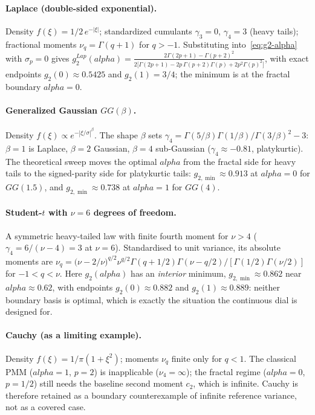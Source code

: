 \documentclass[11pt]{article}
\def\alpha{alpha}%
\def\mathrm#1{#1}%
\def\tfrac#1#2{#1/#2}%
\theoremstyle{definition}
\begin{document}
\paragraph{Laplace (double-sided exponential).}
Density $f(\xi) = \tfrac{1}{2}\,e^{-|\xi|}$; standardized cumulants
$\gamma_3 = 0$, $\gamma_4 = 3$ (heavy tails); fractional moments
$\nu_q = \Gamma(q+1)$ for $q > -1$. Substituting into~\eqref{eq:g2-alpha} with
$\sigma_p = 0$ gives
$g_2^{\mathrm{Lap}}(\alpha) = \frac{2\Gamma(2p+1) - \Gamma(p+2)^2}{2\bigl[\Gamma(2p+1) - 2p\,\Gamma(p+2)\Gamma(p) + 2p^2\Gamma(p)^2\bigr]}$,
with exact endpoints $g_2(0)\approx0.5425$ and $g_2(1)=3/4$; the minimum is at
the fractal boundary $\alpha=0$.

\paragraph{Generalized Gaussian $\mathrm{GG}(\beta)$.}
Density $f(\xi) \propto e^{-|\xi/\sigma|^{\beta}}$. The shape $\beta$ sets
$\gamma_4 = \Gamma(5/\beta)\Gamma(1/\beta)/\Gamma(3/\beta)^2 - 3$:
$\beta=1$ is Laplace, $\beta=2$ Gaussian, $\beta=4$ sub-Gaussian
($\gamma_4\approx-0.81$, platykurtic). The theoretical sweep moves the optimal
$\alpha$ from the fractal side for heavy tails to the signed-parity side for
platykurtic tails: $g_{2,\min}\approx0.913$ at $\alpha=0$ for $\mathrm{GG}(1.5)$,
and $g_{2,\min}\approx0.738$ at $\alpha=1$ for $\mathrm{GG}(4)$.

\paragraph{Student-$t$ with $\nu=6$ degrees of freedom.}
A symmetric heavy-tailed law with finite fourth moment for $\nu>4$
($\gamma_4 = 6/(\nu-4) = 3$ at $\nu=6$). Standardised to unit variance, its
absolute moments are
$\nu_q = \bigl(\tfrac{\nu-2}{\nu}\bigr)^{q/2}\nu^{q/2}
\Gamma(\tfrac{q+1}{2})\Gamma(\tfrac{\nu-q}{2})/[\Gamma(\tfrac12)\Gamma(\tfrac{\nu}{2})]$
for $-1<q<\nu$. Here $g_2(\alpha)$ has an \emph{interior} minimum,
$g_{2,\min}\approx0.862$ near $\alpha\approx0.62$, with endpoints
$g_2(0)\approx0.882$ and $g_2(1)\approx0.889$: neither boundary basis is
optimal, which is exactly the situation the continuous dial is designed for.

\paragraph{Cauchy (as a limiting example).}
Density $f(\xi)=\tfrac{1}{\pi(1+\xi^2)}$; moments $\nu_q$ finite only for $q<1$.
The classical PMM ($\alpha=1$, $p=2$) is inapplicable ($\nu_4=\infty$); the
fractal regime ($\alpha=0$, $p=1/2$) still needs the baseline second moment
$c_2$, which is infinite. Cauchy is therefore retained as a boundary
counterexample of infinite reference variance, not as a covered case.
\end{document}
